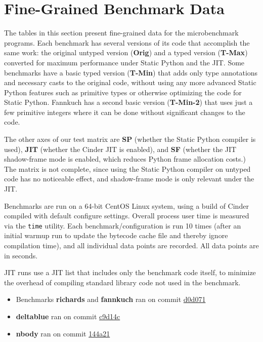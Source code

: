 \documentclass[english,cleveref,crc]{programming}
\newcommand{\code}[1]{\texttt{#1}}
\newcommand{\bmname}[1]{\textbf{#1}}
\begin{document}
\section{Fine-Grained Benchmark Data}
\label{a:microbench-detail}

\newcommand{\colname}[1]{\textbf{#1}}

The tables in this section present fine-grained data for the microbenchmark programs.
Each benchmark has several versions of its code that accomplish the same work:
the original untyped version (\colname{Orig}) and a typed version (\colname{T-Max}) converted for maximum
performance under Static Python and the JIT.
Some benchmarks have a basic typed version (\colname{T-Min}) that adds only
type annotations and necessary casts to the original code,
without using any more advanced Static Python
features such as primitive types or otherwise optimizing the code for Static
Python.
Fannkuch has a second basic version (\colname{T-Min-2}) that uses just a few primitive integers
where it can be done without significant changes to the code.

The other axes of our test matrix are \colname{SP} (whether the Static Python compiler is
used), \colname{JIT} (whether the Cinder JIT is enabled), and \colname{SF} (whether the JIT
shadow-frame mode is enabled, which reduces Python frame allocation costs.) The
matrix is not complete, since using the Static Python compiler on untyped code
has no noticeable effect, and shadow-frame mode is only relevant under the JIT.

Benchmarks are run on a 64-bit CentOS Linux system, using a build of Cinder
compiled with default configure settings. Overall process user time is measured
via the \code{time} utility. Each benchmark/configuration is run 10 times (after an
initial warmup run to update the bytecode cache file and thereby ignore compilation time),
and all individual data points are
recorded. All data points are in seconds.

JIT runs use a JIT list that includes only the benchmark code itself, to
minimize the overhead of compiling standard library code not used in the
benchmark.

\begin{itemize}
  \item
    Benchmarks \bmname{richards} and \bmname{fannkuch} ran on commit
    \href{https://github.com/facebookincubator/cinder/commit/d0d071a9acf3e65700e7c6f8982c5087c700d116}{d0d071}
  \item
    \bmname{deltablue} ran on commit
    \href{https://github.com/facebookincubator/cinder/commit/c9d14c4474facfeca15b618015b58b99a3e86d25}{c9d14c}
  \item
    \bmname{nbody} ran on commit
    \href{https://github.com/facebookincubator/cinder/commit/144a21e66aeae5cde08847482249396b2e16eccc}{144a21}
\end{itemize}
\end{document}
